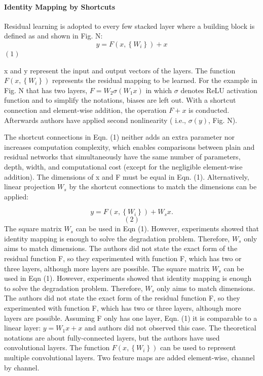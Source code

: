 \documentclass[
]{krantz}
\begin{document}
\hypertarget{identity-mapping-by-shortcuts}{%
\paragraph{Identity Mapping by Shortcuts}\label{identity-mapping-by-shortcuts}}

Residual learning is adopted to every few stacked layer where a building block is defined as and shown in Fig. N:
\[y = F  \left( x,\left\{  W_i\right\} \right) + x \] \((1)\)

x and y represent the input and output vectors of the layers.
The function \(F \left( x,\left\{ W_i\right\} \right)\) represents the residual mapping to be learned. For the example in Fig. N that has two layers, \(F = W_2\sigma\left( W_1x\right)\) in which \(\sigma\) denotes ReLU activation function and to simplify the notations, biases are left out. With a shortcut connection and element-wise addition, the operation \(F + x\) is conducted. Afterwards authors have applied second nonlinearity ( i.e., \(\sigma \left( y \right)\), Fig. N).

The shortcut connections in Eqn. (1) neither adds an extra parameter nor increases computation complexity, which enables comparisons between plain and residual networks that simultaneously have the same number of parameters, depth, width, and computational cost (except for the negligible element-wise addition).
The dimensions of x and F must be equal in Eqn. (1). Alternatively, linear projection \(W_s\) by the shortcut connections to match the dimensions can be applied:

\[y = F  \left( x,\left\{  W_i\right\} \right)+ W_sx. \] \[(2)\]
The square matrix \(W_s\) can be used in Eqn (1). However, experiments showed that identity mapping is enough to solve the degradation problem. Therefore, \(W_s\) only aims to match dimensions. The authors did not state the exact form of the residual function F, so they experimented with function F, which has two or three layers, although more layers are possible. The square matrix \(W_s\) can be used in Eqn (1). However, experiments showed that identity mapping is enough to solve the degradation problem. Therefore, \(W_s\) only aims to match dimensions. The authors did not state the exact form of the residual function F, so they experimented with function F, which has two or three layers, although more layers are possible. Assuming F only has one layer, Eqn. (1) it is comparable to a linear layer: \(y = W_1 x + x\) and authors did not observed this case. The theoretical notations are about fully-connected layers, but the authors have used convolutional layers. The function \(F \left( x,\left\{ W_i\right\} \right)\) can be used to represent multiple convolutional layers. Two feature maps are added element-wise, channel by channel.
\end{document}
